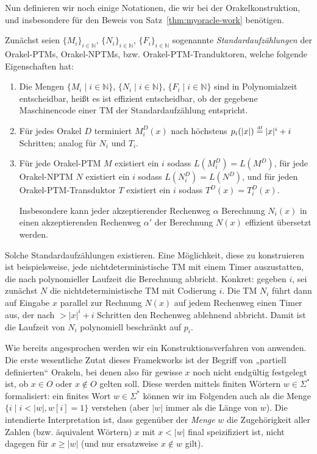 Nun definieren wir noch einige Notationen, die wir bei der Orakelkonstruktion, und insbesondere für den Beweis von Satz~\ref{thm:myoracle-work} benötigen.

Zunächst seien $\{M_i\}_{i\in \mathbb N}$, $\{N_i\}_{i\in \mathbb N}$, $\{F_i\}_{i\in\mathbb N}$ sogenannte \emph{Standardaufzählungen} der Orakel-PTMs, Orakel-NPTMs, bzw. Orakel-PTM-Tranduktoren, welche folgende Eigenschaften hat:
\begin{enumerate}[label=\arabic*.,nosep]
    \item Die Mengen $\{M_i \mid i\in\mathbb N\}$, $\{N_i \mid i\in\mathbb N\}$, $\{F_i \mid i\in\mathbb N\}$ sind in Polynomialzeit entscheidbar, heißt es ist effizient entscheidbar, ob der gegebene Maschinencode einer TM der Standardaufzählung entspricht.
    \item Für jedes Orakel $D$ terminiert $M_i^D(x)$ nach höchstens $p_i(|x|)\stackrel{\text{\smash{\tiny df}}}{=} |x|^i+i$ Schritten; analog für $N_i$ und $T_i$.
    \item Für jede Orakel-PTM $M$ existiert ein $i$ sodass $L(M^D_i)=L(M^D)$, 
        für jede Orakel-NPTM $N$ existiert ein $i$ sodass $L(N^D_i)=L(N^D)$, und
        für jeden Orakel-PTM-Transduktor $T$ existiert ein $i$ sodass $T^D(x)=T_i^D(x)$.

        Insbesondere kann jeder akzeptierender Rechenweg $\alpha$ Berechnung $N_i(x)$ in einen akzeptierenden Rechenweg $\alpha'$ der Berechnung $N(x)$ effizient übersetzt werden.
\end{enumerate}
Solche Standardaufzählungen existieren. Eine Möglichkeit, diese zu konstruieren ist beispielsweise, jede nichtdeterministische TM mit einem Timer auszustatten, die nach polynomieller Laufzeit die Berechnung abbricht. Konkret: gegeben $i$, sei zunächst $N$ die nichtdeterministische TM mit Codierung $i$. Die TM $N_i$ führt dann auf Eingabe $x$ parallel zur Rechnung $N(x)$ auf jedem Rechenweg einen Timer aus, der nach $>|x|^i+i$ Schritten den Rechenweg ablehnend abbricht.
Damit ist die Laufzeit von $N_i$ polynomiell beschränkt auf $p_i$.

Wie bereits angesprochen werden wir ein Konstruktionsverfahren von \citeauthor{dose_np-completeness_2019} anwenden. Die erste wesentliche Zutat dieses Framekworks ist der Begriff von „partiell definierten“ Orakeln, bei denen also für gewisse $x$ noch nicht endgültig festgelegt ist, ob $x\in O$ oder $x\not\in O$ gelten soll.
Diese werden mittels finiten Wörtern $w\in\Sigma^*$ formalisiert:
ein finites Wort $w\in\Sigma^*$ können wir im Folgenden auch als die Menge $\{ i \mid i<|w|, w[i] = 1 \}$ verstehen (aber $|w|$ immer als die Länge von $w$).
Die intendierte Interpretation ist, dass gegenüber der \emph{Menge} $w$ die Zugehörigkeit aller Zahlen (bzw. äquivalent Wörtern) $x$ mit $x<|w|$ final speizifiziert ist, nicht dagegen für $x\geq|w|$ (und nur ersatzweise $x\not\in w$ gilt).

